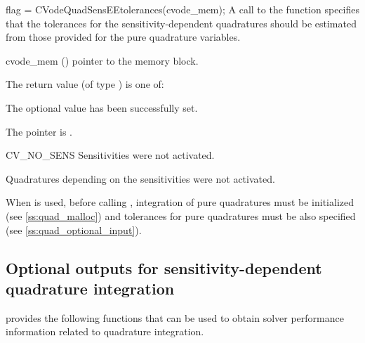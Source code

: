 {
  flag = CVodeQuadSensEEtolerances(cvode\_mem);
}
{
  A call to the function  specifies that the
  tolerances for the sensitivity-dependent quadratures should be estimated from
  those provided for the pure quadrature variables. 
}
{
  \begin{args}
  \item[cvode\_mem] ()
    pointer to the {\cvodes} memory block.
  \end{args}
}
{
  The return value  (of type ) is one of:
  \begin{args}
  \item[\Id{CV\_SUCCESS}] 
    The optional value has been successfully set.
  \item[\Id{CVODE\_MEM\_NULL}]
    The  pointer is .
  \item[CV\_NO\_SENS]
    Sensitivities were not activated.
  \item[\Id{CV\_NO\_QUADSENS}] 
    Quadratures depending on the sensitivities were not activated.
  \end{args}
}
{ 
  When   is used, before calling , 
  integration of pure quadratures must be initialized (see \ref{ss:quad_malloc})
  and tolerances for pure quadratures must be also specified 
  (see \ref{ss:quad_optional_input}).
  
}


\subsection{Optional outputs for sensitivity-dependent quadrature integration}
\label{ss:quad_sens_optional_output}

{\cvodes} provides the following functions that can be used to obtain solver
performance information related to quadrature integration.


